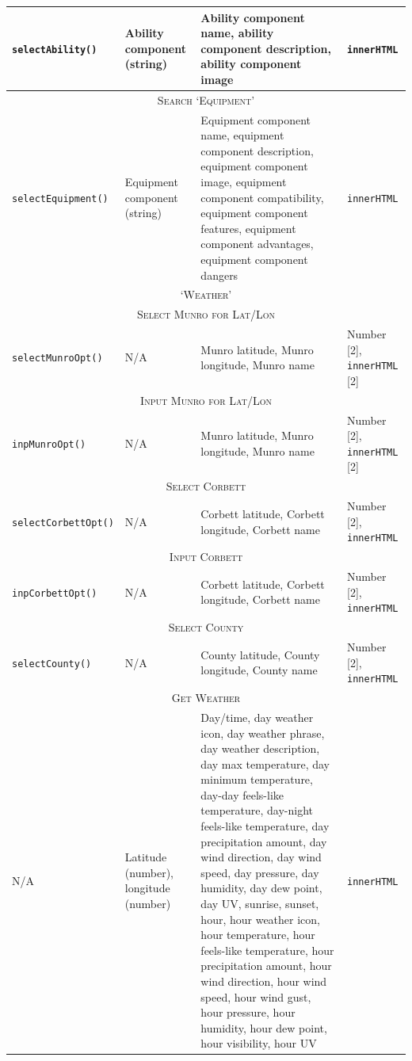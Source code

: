 \documentclass[11pt, english]{article}
\begin{document}
\begin{center}
\begin{longtable}{p{2.25cm}p{3.5cm}p{5cm}p{2cm}}
		\hline
		\texttt{selectAbility()} & Ability component (string) & Ability component name, ability component description, ability component image & \texttt{innerHTML}\\
		\hline
		\multicolumn{4}{c}{\textsc{Search `Equipment'}}\\
		\hline
		\texttt{selectEquipment()} & Equipment component (string) & Equipment component name, equipment component description, equipment component image, equipment component compatibility, equipment component features, equipment component advantages, equipment component dangers & \texttt{innerHTML}\\
		\hline
		\hline
		\multicolumn{4}{c}{\textsc{`Weather'}}\\
		\hline
		\hline
		\multicolumn{4}{c}{\textsc{Select Munro for Lat/Lon}}\\
		\hline
		\texttt{selectMunroOpt()} & N/A & Munro latitude, Munro longitude, Munro name & Number [2], \texttt{innerHTML} [2]\\
		\hline
		\multicolumn{4}{c}{\textsc{Input Munro for Lat/Lon}}\\
		\hline
		\texttt{inpMunroOpt()} & N/A & Munro latitude, Munro longitude, Munro name & Number [2], \texttt{innerHTML} [2]\\
		\hline
		\multicolumn{4}{c}{\textsc{Select Corbett}}\\
		\hline
		\texttt{selectCorbettOpt()} & N/A & Corbett latitude, Corbett longitude, Corbett name & Number [2], \texttt{innerHTML}\\
		\hline
		\multicolumn{4}{c}{\textsc{Input Corbett}}\\
		\hline
		\texttt{inpCorbettOpt()} & N/A & Corbett latitude, Corbett longitude, Corbett name & Number [2], \texttt{innerHTML}\\
		\hline
		\multicolumn{4}{c}{\textsc{Select County}}\\
		\hline
		\texttt{selectCounty()} & N/A & County latitude, County longitude, County name & Number [2], \texttt{innerHTML}\\
		\hline
		\multicolumn{4}{c}{\textsc{Get Weather}}\\
		\hline
		N/A & Latitude (number), longitude (number) & Day/time, day weather icon, day weather phrase, day weather description, day max temperature, day minimum temperature, day-day feels-like temperature, day-night feels-like temperature, day precipitation amount, day wind direction, day wind speed, day pressure, day humidity, day dew point, day UV, sunrise, sunset, hour, hour weather icon, hour temperature, hour feels-like temperature, hour precipitation amount, hour wind direction, hour wind speed, hour wind gust, hour pressure, hour humidity, hour dew point, hour visibility, hour UV & \texttt{innerHTML}\\

\end{longtable}
\end{center}
\end{document}
